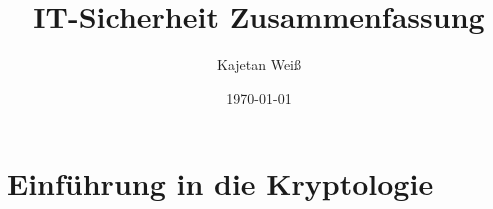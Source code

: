 %





\title{IT-Sicherheit Zusammenfassung}
\author{Kajetan Weiß}
\date{\today}
\maketitle



\tableofcontents



\part{Einführung in die Kryptologie}









%
